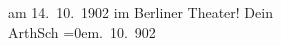 \begin{ledgroupsized}[t]{13cm}
{{{                  am 14. 10. 1902 im Berliner Theater}}}\label{K_L01241_1h}!\pend
           \pstart
           Dein{\\[\baselineskip]}\spacefill\mbox{ArthSch}\pend
           \leftskip=0em{}. 10. 902\pend
                     \endnumbering{}\end{ledgroupsized}  \newcommand{\dateiname}{L01241}\newcommand{\titel}{Arthur Schnitzler an Hermann Bahr, 15. 10. 1902}\newcommand{\editorInnen}{ Kurt Ifkovits,  Martin Anton Müller}
            \footnotesize
\begin{ledgroupsized}[t]{11.5cm}
\end{ledgroupsized}
         
      